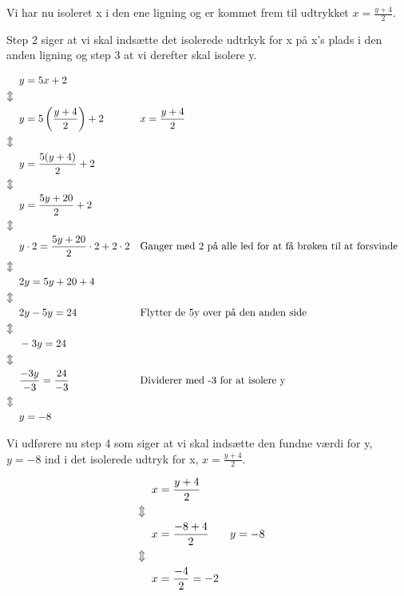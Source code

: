 Vi har nu isoleret x i den ene ligning og er kommet frem til udtrykket $x = \frac{y + 4}{2}$.

Step 2 siger at vi skal indsætte det isolerede udtrkyk for x på x's plads i den anden ligning og step 3 at vi derefter skal isolere y. 

\begin{align*}
&y = 5x + 2 \\
\Updownarrow \hspace*{2mm} &\\
&y = 5\left(\frac{y + 4}{2}\right) + 2 && x = \frac{y + 4}{2}\\
\Updownarrow \hspace*{2mm} &\\
&y = \frac{5(y + 4)}{2} + 2 \\
\Updownarrow \hspace*{2mm} &\\
&y = \frac{5y + 20}{2} + 2 \\
\Updownarrow \hspace*{2mm} &\\
&y \cdot 2 = \frac{5y + 20}{2}\cdot 2 + 2 \cdot 2 && \text{Ganger med 2 på alle led for at få brøken til at forsvinde}\\
\Updownarrow \hspace*{2mm} &\\
&2y = 5y + 20 + 4 \\
\Updownarrow \hspace*{2mm} &\\
&2y - 5y = 24 && \text{Flytter de 5y over på den anden side}\\
\Updownarrow \hspace*{2mm} &\\
&-3y = 24 \\
\Updownarrow \hspace*{2mm} &\\
&\frac{-3y}{-3} = \frac{24}{-3} && \text{Dividerer med -3 for at isolere y}\\
\Updownarrow \hspace*{2mm} &\\
&y = -8
\end{align*}

Vi udførere nu step 4 som siger at vi skal indsætte den fundne værdi for y, $y = -8$ ind i det isolerede udtryk for x, $x = \frac{y + 4}{2}$.

\begin{align*}
&x = \frac{y + 4}{2}\\
\Updownarrow \hspace*{2mm} &\\
&x = \frac{-8 + 4}{2} && y = -8\\
\Updownarrow \hspace*{2mm} &\\
&x = \frac{-4}{2} = -2
\end{align*}

